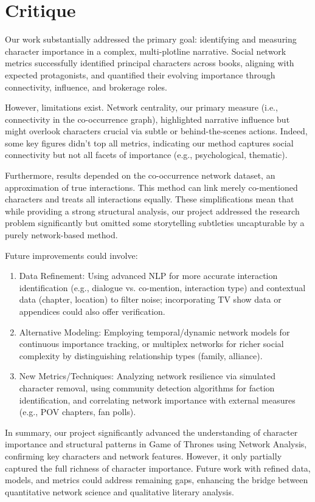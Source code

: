 \documentclass[12pt, a4paper]{article}
\begin{document}
	\section{Critique}
	Our work substantially addressed the primary goal: identifying and measuring character importance in a complex, multi-plotline narrative. Social network metrics successfully identified principal characters across books, aligning with expected protagonists, and quantified their evolving importance through connectivity, influence, and brokerage roles.

	However, limitations exist. Network centrality, our primary measure (i.e., connectivity in the co-occurrence graph), highlighted narrative influence but might overlook characters crucial via subtle or behind-the-scenes actions. Indeed, some key figures didn't top all metrics, indicating our method captures social connectivity but not all facets of importance (e.g., psychological, thematic).

	Furthermore, results depended on the co-occurrence network dataset, an approximation of true interactions. This method can link merely co-mentioned characters and treats all interactions equally. These simplifications mean that while providing a strong structural analysis, our project addressed the research problem significantly but omitted some storytelling subtleties uncapturable by a purely network-based method.

	Future improvements could involve: 
	\begin{enumerate}
	    \item {Data Refinement:} Using advanced NLP for more accurate interaction identification (e.g., dialogue vs. co-mention, interaction type) and contextual data (chapter, location) to filter noise; incorporating TV show data or appendices could also offer verification.
	    \item {Alternative Modeling:} Employing temporal/dynamic network models for continuous importance tracking, or multiplex networks for richer social complexity by distinguishing relationship types (family, alliance).
	    \item {New Metrics/Techniques:} Analyzing network resilience via simulated character removal, using community detection algorithms for faction identification, and correlating network importance with external measures (e.g., POV chapters, fan polls).
	\end{enumerate}

	In summary, our project significantly advanced the understanding of character importance and structural patterns in Game of Thrones using Network Analysis, confirming key characters and network features. However, it only partially captured the full richness of character importance. Future work with refined data, models, and metrics could address remaining gaps, enhancing the bridge between quantitative network science and qualitative literary analysis.
\end{document}
